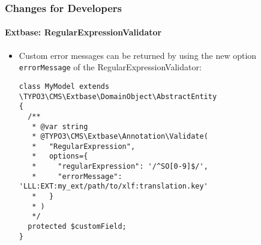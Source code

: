 %

\begin{frame}[fragile]
	\frametitle{Changes for Developers}
	\framesubtitle{Extbase: RegularExpressionValidator}


	\begin{itemize}
		\item Custom error messages can be returned by using the new option
			\texttt{errorMessage} of the RegularExpressionValidator:
\begin{lstlisting}
class MyModel extends \TYPO3\CMS\Extbase\DomainObject\AbstractEntity
{
  /**
   * @var string
   * @TYPO3\CMS\Extbase\Annotation\Validate(
   *   "RegularExpression",
   *   options={
   *     "regularExpression": '/^SO[0-9]$/',
   *     "errorMessage": 'LLL:EXT:my_ext/path/to/xlf:translation.key'
   *   }
   * )
   */
  protected $customField;
}
\end{lstlisting}

	\end{itemize}

\end{frame}

